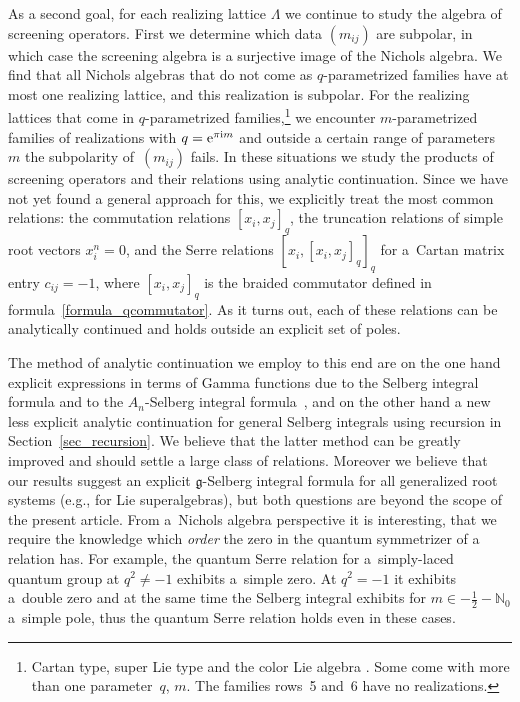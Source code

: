 \documentclass[10pt,a4paper]{amsart}
\numberwithin{equation}{section}
\newcommand{\N}{\mathbb{N}}
\renewcommand{\i}{\mathrm{i}}
\newcommand{\g}{\mathfrak{g}}
\begin{document}
As a second goal, for each realizing lattice $\Lambda$ we continue to study the algebra of screening operators. First we determine which data $(m_{ij})$ are subpolar, in which case the screening algebra is a surjective image of the Nichols algebra. We find that all Nichols algebras that do not come as $q$-parametrized families have at most one realizing lattice, and this realization is subpolar. For the realizing lattices that come in $q$-parametrized families,\footnote{Cartan type, super Lie type and the color Lie algebra \cite[Table~1, row~6]{Hecklist}. Some come with more than one parameter~$q$, $m$. The families \cite{Heck06} rows~5 and~6 have no realizations.} we encounter $m$-parametrized families of realizations with $q={\rm e}^{\pi\i m}$ and outside a certain range of parameters~$m$ the subpolarity of~$(m_{ij})$ fails. In these situations we study the products of screening operators and their relations using analytic continuation. Since we have not yet found a general approach for this, we explicitly treat the most common relations: the commutation relations $[x_i,x_j]_q$, the truncation relations of simple root vectors $x_i^n=0$, and the Serre relations $[x_i,[x_i,x_j]_q]_q$ for a~Cartan matrix entry $c_{ij}=-1$, where $[x_i,x_j]_q$ is the braided commutator defined in formula~\eqref{formula_qcommutator}. As it turns out, each of these relations can be analytically continued and holds outside an explicit set of poles.

The method of analytic continuation we employ to this end are on the one hand explicit expressions in terms of Gamma functions due to the Selberg integral formula and to the $A_n$-Selberg integral formula~\cite{TV03,War09}, and on the other hand a new less explicit analytic continuation for general Selberg integrals using recursion in Section~\ref{sec_recursion}. We believe that the latter method can be greatly improved and should settle a large class of relations. Moreover we believe that our results suggest an explicit $\g$-Selberg integral formula for all generalized root systems (e.g., for Lie superalgebras), but both questions are beyond the scope of the present article. From a~Nichols algebra perspective it is interesting, that we require the knowledge which \emph{order} the zero in the quantum symmetrizer of a relation has. For example, the quantum Serre relation for a~simply-laced quantum group at $q^2\neq -1$ exhibits a~simple zero. At $q^2=-1$ it exhibits a~double zero and at the same time the Selberg integral exhibits for $m\in -\frac{1}{2}-\N_0$ a~simple pole, thus the quantum Serre relation holds even in these cases.
\end{document}
